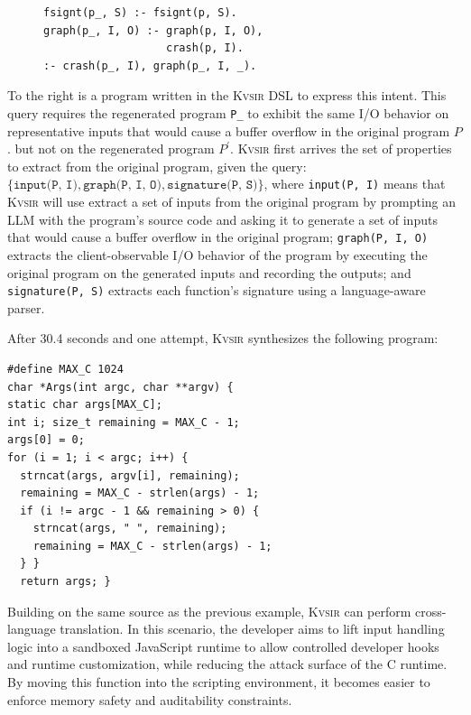 \documentclass[sigplan,review,anonymous,10pt]{acmart}
\newcommand{\sys}{{\scshape Kv{\textalpha}sir}\xspace}
\newcommand{\ttt}[1]{\texttt{#1}\xspace}
\begin{document}
\begin{figure}
\begin{verbatim}
fsignt(p_, S) :- fsignt(p, S).
graph(p_, I, O) :- graph(p, I, O),
                   crash(p, I).
:- crash(p_, I), graph(p_, I, _).
\end{verbatim}
\end{figure}
To the right is a program written in the \sys DSL to express this intent.
This query requires the regenerated program \texttt{P\_} to exhibit the same
I/O behavior on representative inputs that would cause a buffer overflow in the original program $P$.
but not on the regenerated program $P^\prime$.
\sys first arrives the set of properties to extract from the
original program, given the query:
$\{\ttt{input(P, I)}, \ttt{graph(P, I, O)}, \ttt{signature(P, S)}\}$, where
\texttt{input(P, I)} means that \sys will use extract a set of inputs from the original program
by prompting an LLM with the program's source code and asking it to generate a set of inputs that
would cause a buffer overflow in the original program;
\texttt{graph(P, I, O)} extracts the client-observable I/O behavior of the program
by executing the original program on the generated inputs and recording the outputs;
and \texttt{signature(P, S)} extracts each function's signature using a language-aware parser.

After 30.4 seconds and one attempt, \sys synthesizes the following program:
\begin{verbatim}
#define MAX_C 1024
char *Args(int argc, char **argv) {
static char args[MAX_C];
int i; size_t remaining = MAX_C - 1;
args[0] = 0;
for (i = 1; i < argc; i++) {
  strncat(args, argv[i], remaining);
  remaining = MAX_C - strlen(args) - 1;
  if (i != argc - 1 && remaining > 0) {
    strncat(args, " ", remaining);
    remaining = MAX_C - strlen(args) - 1;
  } }
  return args; }
\end{verbatim}

Building on the same source as the previous example, \sys can perform
cross-language translation.
In this scenario, the developer aims to lift input
handling logic into a sandboxed JavaScript runtime to allow controlled
developer hooks and runtime customization, while reducing the attack surface of
the C runtime.
By moving this function into the scripting environment, it
becomes easier to enforce memory safety and auditability constraints.
\end{document}
